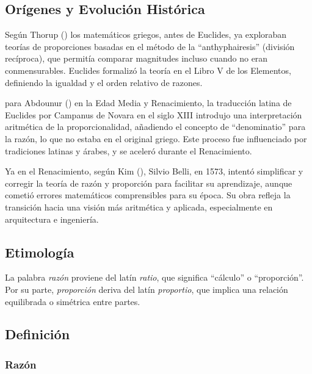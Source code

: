 \documentclass[
  stu,
  floatsintext,
  longtable,
  a4paper,
  nolmodern,
  notxfonts,
  notimes,
  12pt,
  colorlinks=true,linkcolor=blue,citecolor=blue,urlcolor=blue]{apa7}
\begin{document}
\subsection{Orígenes y Evolución
Histórica}\label{oruxedgenes-y-evoluciuxf3n-histuxf3rica}

Según Thorup
() los
matemáticos griegos, antes de Euclides, ya exploraban teorías de
proporciones basadas en el método de la ``anthyphairesis'' (división
recíproca), que permitía comparar magnitudes incluso cuando no eran
conmensurables. Euclides formalizó la teoría en el Libro V de los
Elementos, definiendo la igualdad y el orden relativo de razones.

para Abdounur
() en la Edad
Media y Renacimiento, la traducción latina de Euclides por Campanus de
Novara en el siglo XIII introdujo una interpretación aritmética de la
proporcionalidad, añadiendo el concepto de ``denominatio'' para la
razón, lo que no estaba en el original griego. Este proceso fue
influenciado por tradiciones latinas y árabes, y se aceleró durante el
Renacimiento.

Ya en el Renacimiento, según Kim
(), Silvio Belli, en 1573,
intentó simplificar y corregir la teoría de razón y proporción para
facilitar su aprendizaje, aunque cometió errores matemáticos
comprensibles para su época. Su obra refleja la transición hacia una
visión más aritmética y aplicada, especialmente en arquitectura e
ingeniería.

\subsection{Etimología}\label{etimologuxeda}

La palabra \emph{razón} proviene del latín \emph{ratio}, que significa
``cálculo'' o ``proporción''. Por su parte, \emph{proporción} deriva del
latín \emph{proportio}, que implica una relación equilibrada o simétrica
entre partes.

\subsection{Definición}\label{definiciuxf3n}

\subsubsection{Razón}\label{razuxf3n}
\end{document}
